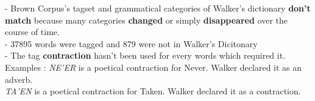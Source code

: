 \begin{center}

- Brown Corpus's tagset and grammatical categories of Walker's dictionary \textbf{don't match}
because many categories \textbf{changed} or simply \textbf{disappeared} over the course of time. \\[2mm]

- 37895 words were tagged and 879 were not in Walker's Dicitonary\\[2mm]

- The tag \textbf{contraction}  hasn't been used for every words which required it. \\
Examples :  \textit{NE'ER} is a poetical contraction for Never. Walker declared it as an adverb.\\
\textit{TA'EN} is a poetical contraction for Taken. Walker declared it as a contraction.

\end{center}




